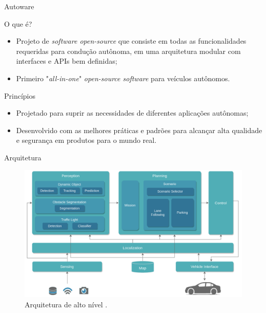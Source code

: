 \documentclass{if-beamer}
\begin{document}
\begin{frame}{Autoware}
	
	\begin{block}{O que é?}
		\begin{itemize}
			\item Projeto de \textit{software open-source} que consiste em todas as funcionalidades requeridas para condução autônoma, em uma arquitetura modular com interfaces e APIs bem definidas;
			\item Primeiro "\textit{all-in-one}" \textit{open-source software} para veículos autônomos.
		\end{itemize}
	\end{block}
	
	\begin{block}{Princípios}
		\begin{itemize}
			\item Projetado para suprir as necessidades de diferentes aplicações autônomas;
			\item Desenvolvido com as melhores práticas e padrões para alcançar alta qualidade e segurança em produtos para o mundo real.
		\end{itemize}
	\end{block}
	
	
\end{frame}

\begin{frame}{Arquitetura}
	
	\begin{figure}
		\centering
		\includegraphics[width=1\linewidth]{img/HL_architecture}
		\caption{Arquitetura de alto nível \cite{autowareArchitecture}.}
		\label{fig:hlarchitecture}
	\end{figure}
	
\end{frame}
\end{document}
